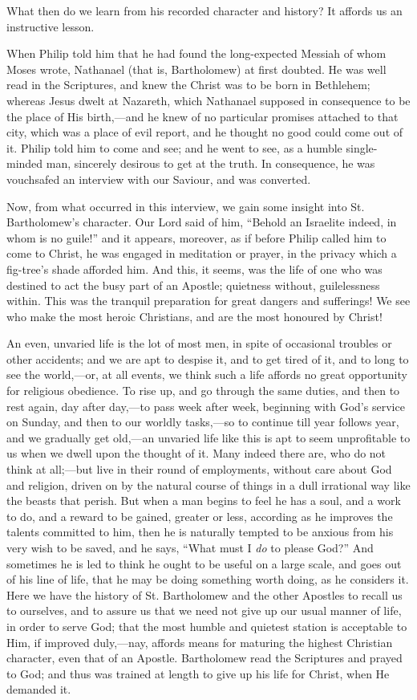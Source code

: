 What then do we learn from his recorded character and history? It
affords us an instructive lesson.

When Philip told him that he had found the long-expected Messiah of
whom Moses wrote, Nathanael (that is, Bartholomew) at first doubted. He
was well read in the Scriptures, and knew the Christ was to be born in
Bethlehem; whereas Jesus dwelt at Nazareth, which Nathanael supposed in
consequence to be the place of His birth,—and he knew of no particular
promises attached to that city, which was a place of evil report, and he
thought no good could come out of it. Philip told him to come and see;
and he went to see, as a humble single-minded man, sincerely desirous to
get at the truth. In consequence, he was vouchsafed an interview with
our Saviour, and was converted.

Now, from what occurred in this interview, we gain some insight into
St. Bartholomew's character. Our Lord said of him, ``Behold an
Israelite indeed, in whom is no guile!'' and it appears, moreover,
as if before Philip called him to come to Christ, he was engaged in
meditation or prayer, in the privacy which a fig-tree's shade afforded
him. And this, it seems, was the life of one who was destined to act the
busy part of an Apostle; quietness without, guilelessness within. This
was the tranquil preparation for great dangers and sufferings! We see
who make the most heroic Christians, and are the most honoured by
Christ!

An even, unvaried life is the lot of most men, in spite of occasional
troubles or other accidents; and we are apt to despise it, and to get
tired of it, and to long to see the world,—or, at all events, we think
such a life affords no great opportunity for religious obedience. To
rise up, and go through the same duties, and then to rest again, day
after day,—to pass week after week, beginning with God's service on
Sunday, and then to our worldly tasks,—so to continue till year
follows year, and we gradually get old,—an unvaried life like this is
apt to seem unprofitable to us when we dwell upon the thought of it.
Many indeed there are, who do not think at all;—but live in their
round of employments, without care about God and religion, driven on by
the natural course of things in a dull irrational way like the beasts
that perish. But when a man begins to feel he has a soul, and a work to
do, and a reward to be gained, greater or less, according as he improves
the talents committed to him, then he is naturally tempted to be anxious
from his very wish to be saved, and he says, ``What must I \emph{do} to
please God?'' And sometimes he is led to think he ought to be useful
on a large scale, and goes out of his line of life, that he may be doing
something worth doing, as he considers it. Here we have the history of
St. Bartholomew and the other Apostles to recall us to ourselves, and to
assure us that we need not give up our usual manner of life, in order to
serve God; that the most humble and quietest station is acceptable to
Him, if improved duly,—nay, affords means for maturing the highest
Christian character, even that of an Apostle. Bartholomew read the
Scriptures and prayed to God; and thus was trained at length to give up
his life for Christ, when He demanded it.

